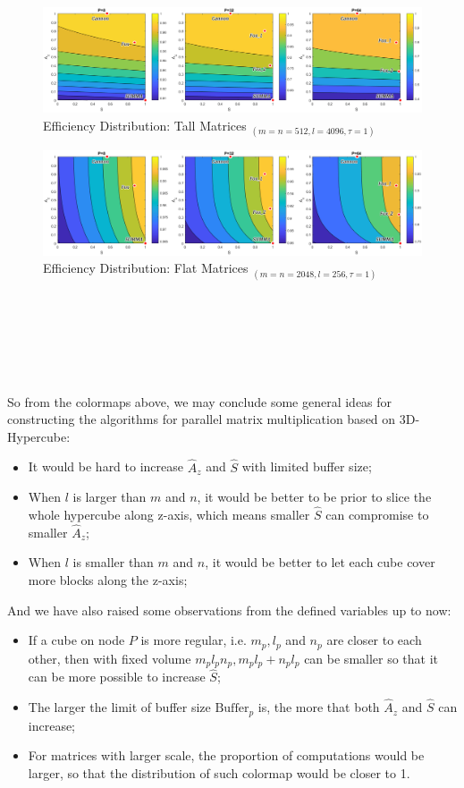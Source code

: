 \documentclass{amsart}
\theoremstyle{definition}
\theoremstyle{remark}
\numberwithin{equation}{section}
\begin{document}
\begin{figure}[h]
	\includegraphics[scale=0.35]{Figures/Tall.png}
	\caption{Efficiency Distribution: Tall Matrices $_{(m=n=512,l=4096,\tau=1)}$}
\end{figure}
\begin{figure}[h]
	\includegraphics[scale=0.35]{Figures/Flat.png}
	\caption{Efficiency Distribution: Flat Matrices $_{(m=n=2048,l=256,\tau=1)}$}
\end{figure}
~\\~\\~\\~\\~\\
\par
So from the colormaps above, we may conclude some general ideas for constructing the algorithms for parallel matrix multiplication based on 3D-Hypercube:
\begin{itemize}
\item It would be hard to increase $\hat{A}_z$ and $\hat{S}$ with limited buffer size;
\item When $l$ is larger than $m$ and $n$, it would be better to be prior to slice the whole hypercube along z-axis, which means smaller $\hat{S}$ can compromise to smaller $\hat{A}_z$;
\item When $l$ is smaller than $m$ and $n$, it would be better to let each cube cover more blocks along the z-axis;\
\end{itemize}
\par
And we have also raised some observations from the defined variables up to now:
\begin{itemize}
\item If a cube on node $P$ is more regular, i.e. $m_p,l_p$ and $n_p$ are closer to each other, then with fixed volume $m_pl_pn_p, m_pl_p+n_pl_p$ can be smaller so that it can be more possible to increase $\hat{S}$;
\item The larger the limit of buffer size $\text{Buffer}_p$ is, the more that both $\hat{A}_z$ and $\hat{S}$ can increase;
\item For matrices with larger scale, the proportion of computations would be larger, so that the distribution of such colormap would be closer to 1.
\end{itemize}
\end{document}
